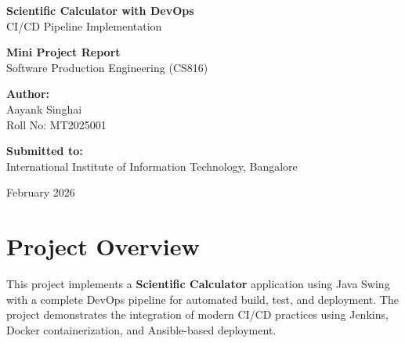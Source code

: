 \documentclass[12pt,a4paper]{article}
\begin{document}
\begin{titlepage}
    \centering
    \vspace*{2cm}

    {\Huge\bfseries Scientific Calculator with DevOps\\[0.5cm]}
    {\Large CI/CD Pipeline Implementation}

    \vspace{1.5cm}

    {\large\textbf{Mini Project Report}}\\
    {\large Software Production Engineering (CS816)}

    \vspace{2cm}

    \begin{figure}[H]
        \centering
    \end{figure}

    \vspace{1.5cm}

    {\Large\textbf{Author:}}\\[0.3cm]
    {\large Aayank Singhai}\\
    {\large Roll No: MT2025001}

    \vspace{1cm}

    {\Large\textbf{Submitted to:}}\\[0.3cm]
    {\large International Institute of Information Technology, Bangalore}

    \vfill

    {\large February 2026}

\end{titlepage}

\tableofcontents
\newpage

\section{Project Overview}

This project implements a \textbf{Scientific Calculator} application using Java Swing with a complete DevOps pipeline for automated build, test, and deployment. The project demonstrates the integration of modern CI/CD practices using Jenkins, Docker containerization, and Ansible-based deployment.
\end{document}
